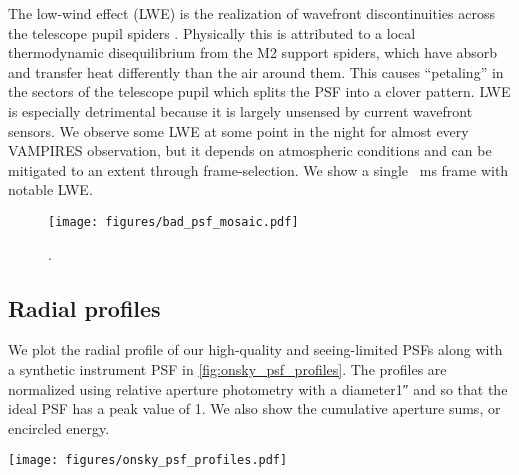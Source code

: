 The low-wind effect (LWE) is the realization of wavefront discontinuities across the telescope pupil spiders  \citep{cantalloube_origin_2018}. Physically this is attributed to a local thermodynamic disequilibrium from the M2 support spiders, which have absorb and transfer heat differently than the air around them. This causes ``petaling'' in the sectors of the telescope pupil which splits the PSF into a clover pattern. LWE is especially detrimental because it is largely unsensed by current wavefront sensors. We observe some LWE at some point in the night for almost every VAMPIRES observation, but it depends on atmospheric conditions and can be mitigated to an extent through frame-selection. We show a single \SI{}{\milli\second} frame with notable LWE.


\begin{figure}
    \centering
    \texttt{[image: figures/bad\_psf\_mosaic.pdf]}
    \caption{.\label{fig:bad_psfs}}
\end{figure}

\subsection{Radial profiles}
We plot the radial profile of our high-quality and seeing-limited PSFs along with a synthetic instrument PSF in \autoref{fig:onsky_psf_profiles}. The profiles are normalized using relative aperture photometry with a  diameter\ang{;;1} and so that the ideal PSF has a peak value of 1. We also show the cumulative aperture sums, or encircled energy.
\begin{figure*}
    \centering
    \texttt{[image: figures/onsky\_psf\_profiles.pdf]}
    \caption{\label{fig:onsky_psf_profiles}}
\end{figure*}
